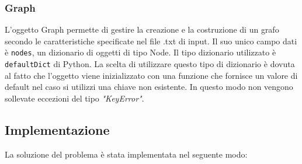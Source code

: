 \subsubsection{Graph}
L'oggetto Graph permette di gestire la creazione e la costruzione di un grafo secondo le caratteristiche specificate nel file .txt di input. Il suo unico campo dati è \texttt{nodes}, un dizionario di oggetti di tipo Node. Il tipo dizionario utilizzato è \texttt{defaultDict} di Python. La scelta di utilizzare questo tipo di dizionario è dovuta al fatto che l'oggetto viene inizializzato con una funzione che fornisce un valore di default nel caso si utilizzi una chiave non esistente. In questo modo non vengono sollevate eccezioni del tipo \emph{"KeyError"}.

\subsection{Implementazione}
La soluzione del problema è stata implementata nel seguente modo:
